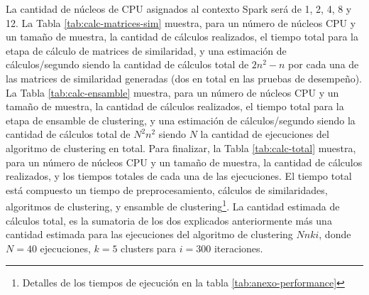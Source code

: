 \bigskip La cantidad de núcleos de CPU asignados al contexto Spark será de 1, 2, 4, 8 y 12. La Tabla \ref{tab:calc-matrices-sim} muestra, para un número de núcleos CPU y un tamaño de muestra, la cantidad de cálculos realizados, el tiempo total para la etapa de cálculo de matrices de similaridad, y una estimación de cálculos/segundo siendo la cantidad de cálculos total de \(2n^2-n\) por cada una de las matrices de similaridad generadas (dos en total en las pruebas de desempeño). La Tabla \ref{tab:calc-ensamble} muestra, para un número de núcleos CPU y un tamaño de muestra, la cantidad de cálculos realizados, el tiempo total para la etapa de ensamble de clustering, y una estimación de cálculos/segundo siendo la cantidad de cálculos total de \(N^2n^2\) siendo \(N\) la cantidad de ejecuciones del algoritmo de clustering en total. Para finalizar, la Tabla \ref{tab:calc-total}  muestra, para un número de núcleos CPU y un tamaño de muestra, la cantidad de cálculos realizados, y los tiempos totales de cada una de las ejecuciones. El tiempo total está compuesto un tiempo de preprocesamiento, cálculos de similaridades, algoritmos de clustering, y ensamble de clustering\footnote{Detalles de los tiempos de ejecución en la tabla \ref{tab:anexo-performance}}. La cantidad estimada de cálculos total, es la sumatoria de los dos explicados anteriormente más una cantidad estimada para las ejecuciones del algoritmo de clustering \(Nnki\), donde \(N=40\) ejecuciones, \(k=5\) clusters para \(i=300\) iteraciones.

